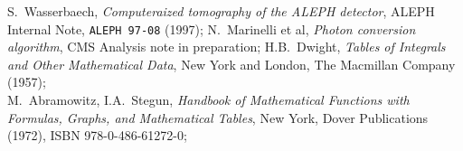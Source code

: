 \begin{thebibliography}{99}

 S.~Wasserbaech, {\em Computeraized tomography of the
    ALEPH detector}, ALEPH Internal Note, {\tt ALEPH 97-08} (1997);
 N.~Marinelli et al, {\em Photon conversion algorithm},
  CMS Analysis note in preparation;
 H.B.~Dwight, {\em Tables of Integrals and Other
    Mathematical Data}, New York and London, The Macmillan Company (1957);\\
  M.~Abramowitz, I.A.~Stegun, {\em Handbook of Mathematical
  Functions with Formulas, Graphs, and Mathematical Tables}, New York,
  Dover Publications (1972), ISBN 978-0-486-61272-0;

\end{thebibliography}
